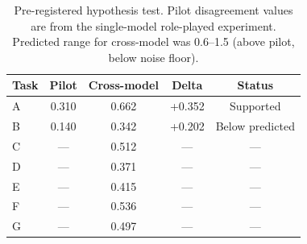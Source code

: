\begin{table}[t]
\centering
\caption{Pre-registered hypothesis test. Pilot disagreement values are from the single-model role-played experiment. Predicted range for cross-model was 0.6--1.5 (above pilot, below noise floor).}
\label{tab:hypothesis}
\small
\begin{tabular}{lcccc}
\toprule
Task & Pilot & Cross-model & Delta & Status \\
\midrule
A & 0.310 & 0.662 & +0.352 & Supported \\
B & 0.140 & 0.342 & +0.202 & Below predicted \\
C & --- & 0.512 & --- & --- \\
D & --- & 0.371 & --- & --- \\
E & --- & 0.415 & --- & --- \\
F & --- & 0.536 & --- & --- \\
G & --- & 0.497 & --- & --- \\
\bottomrule
\end{tabular}
\end{table}
